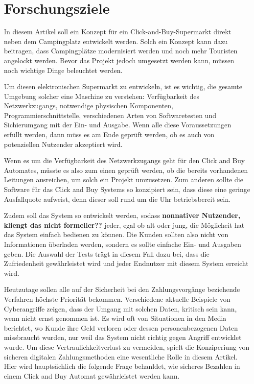 \section{Forschungsziele}


In diesem Artikel soll ein Konzept für ein Click-and-Buy-Supermarkt direkt neben dem Campingplatz 
entwickelt werden. Solch ein Konzept kann dazu beitragen, dass Campingplätze modernisiert werden 
und noch mehr Touristen angelockt werden. Bevor das Projekt jedoch umgesetzt werden kann, müssen 
noch wichtige Dinge beleuchtet werden. 

Um diesen elektronischen Supermarkt zu entwickeln, ist es wichtig, die gesamte Umgebung solcher eine Maschine
zu verstehen: Verfügbarkeit des Netzwerkzugangs, notwendige physischen Komponenten, Programmierschnittstelle,
verschiedenen Arten von Softwaretesten und Sichierumgang mit der Ein- und Ausgabe. Wenn alle diese 
Voraussetzungen erfüllt werden, dann müss es am Ende geprüft werden, ob es auch von potenziellen Nutzender 
akzeptiert wird. 

Wenn es um die Verfügbarkeit des Netzwerkzugangs geht für den Click and Buy Automates, müsste es also zum einen 
geprüft werden, ob die bereits vorhandenen Leitungen ausreichen, um solch ein Projekt umzusetzen. Zum anderen 
sollte die Software für das Click and Buy Systems so konzipiert sein, dass diese eine geringe Ausfallquote
aufweist, denn dieser soll rund um die Uhr betriebsbereit sein.

Zudem soll das System so entwickelt werden, sodass \textbf{nonnativer Nutzender, kliengt das nicht 
formeller??} jeder, egal ob alt oder jung, die Möglicheit hat das System einfach bedienen zu können. 
Die Kunden sollten also nicht von Informationen überladen werden, sondern es sollte einfache Ein- 
und Ausgaben geben. Die Auswahl der Tests trägt in diesem Fall dazu bei, dass die Zufriedenheit
gewährleistet wird und jeder Endnutzer mit diesem System erreicht wird.

Heutzutage sollen alle auf der Sicherheit bei den Zahlungsvorgänge beziehende Verfahren höchste 
Priorität bekommen. Verschiedene aktuelle Beispiele von Cyberangriffe zeigen, dass der Umgang mit solchen 
Daten, kritisch sein kann, wenn nicht ernst genommen ist. Es wird oft von Situationen in den Media berichtet,
wo Kunde ihre Geld verloren oder dessen personenbezogenen Daten missbraucht wurden, nur weil das System
nicht richtig gegen Angriff entwicklet wurde. Um diese  Vertraulichkeitverlust zu vermeiden, spielt die 
Konziperiung von sicheren digitalen Zahlungsmethoden eine wesentliche Rolle in diesem Artikel. 
Hier wird hauptsächlich die folgende Frage behanldet, wie sicheres Bezahlen in einem Click and Buy 
Automat gewährleistet werden kann.